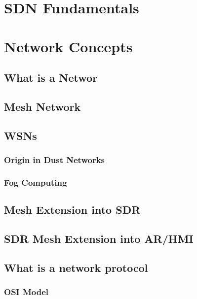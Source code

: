 \section{SDN Fundamentals}


\section{Network Concepts}

\subsection{What is a Networ}

\subsection{Mesh Network}

\subsection{WSNs}

\subsubsection{Origin in Dust Networks}

\subsubsection{Fog Computing}

\subsection{Mesh Extension into SDR}

\subsection{SDR Mesh Extension into AR/HMI}

\subsection{What is a network protocol}

\subsubsection{OSI Model}

